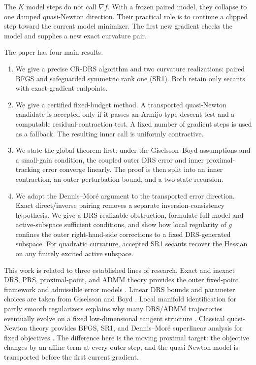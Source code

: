 \documentclass[10pt,leqno]{amsart}
\numberwithin{equation}{section}
\numberwithin{algorithm}{section}
\theoremstyle{remark}
\newcommand{\grad}{\nabla}
\begin{document}
The $K$ model steps do not call $\grad f$.  With a frozen paired model, they collapse to one damped quasi-Newton direction.  Their practical role is to continue a clipped step toward the current model minimizer.  The first new gradient checks the model and supplies a new exact curvature pair.

The paper has four main results.
\begin{enumerate}[label=(\roman*),leftmargin=2.2em]
    \item We give a precise CR-DRS algorithm and two curvature realizations: paired BFGS and safeguarded symmetric rank one (SR1).  Both retain only secants with exact-gradient endpoints.
    \item We give a certified fixed-budget method.  A transported quasi-Newton candidate is accepted only if it passes an Armijo-type descent test and a computable residual-contraction test.  A fixed number of gradient steps is used as a fallback.  The resulting inner call is uniformly contractive.
    \item We state the global theorem first: under the Giselsson--Boyd assumptions and a small-gain condition, the coupled outer DRS error and inner proximal-tracking error converge linearly.  The proof is then split into an inner contraction, an outer perturbation bound, and a two-state recursion.
    \item We adapt the Dennis--Mor\'e argument to the transported error direction.  Exact direct/inverse pairing removes a separate inversion-consistency hypothesis.  We give a DRS-realizable obstruction, formulate full-model and active-subspace sufficient conditions, and show how local regularity of $g$ confines the outer right-hand-side corrections to a fixed DRS-generated subspace.  For quadratic curvature, accepted SR1 secants recover the Hessian on any finitely excited active subspace.
\end{enumerate}

This work is related to three established lines of research.  Exact and inexact DRS, PRS, proximal-point, and ADMM theory provides the outer fixed-point framework and admissible error models \cite{DouglasRachford1956,LionsMercier1979,Rockafellar1976,EcksteinBertsekas1992,BauschkeCombettes2017,AlvesEcksteinGeremiaMelo2020}.  Linear DRS bounds and parameter choices are taken from Giselsson and Boyd \cite{GiselssonBoyd2017}.  Local manifold identification for partly smooth regularizers explains why many DRS/ADMM trajectories eventually evolve on a fixed low-dimensional tangent structure \cite{LiangFadiliPeyreLuke2015}.  Classical quasi-Newton theory provides BFGS, SR1, and Dennis--Mor\'e superlinear analysis for fixed objectives \cite{BroydenDennisMore1973,dennismore1974,DennisMore1977,NocedalWright2006}.  The difference here is the moving proximal target: the objective changes by an affine term at every outer step, and the quasi-Newton model is transported before the first current gradient.
\end{document}
